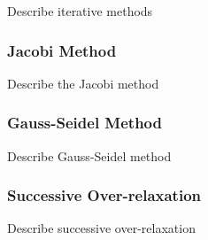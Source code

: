 Describe iterative methods

\subsubsection*{Jacobi Method}

Describe the Jacobi method

\subsubsection*{Gauss-Seidel Method}

Describe Gauss-Seidel method

\subsubsection*{Successive Over-relaxation}

Describe successive over-relaxation
